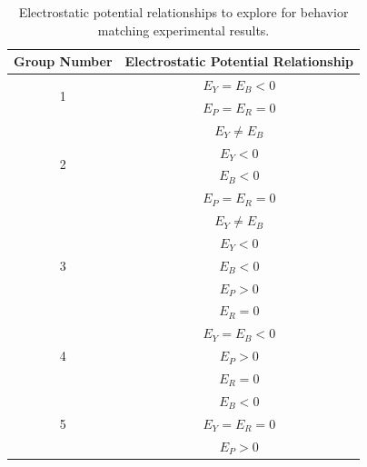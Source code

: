 \documentclass[../../AdvancementSummary.tex]{subfiles}
\begin{document}
\begin{table}[H]
\caption{Electrostatic potential relationships to explore for behavior matching experimental results. \label{table: ElecPotentialRelationships}}
\begin{center}
\begin{tabular}{| c | c |}
\hline
Group Number & Electrostatic Potential Relationship \\
\hline
\multicolumn{1}{|c|}{\multirow{2}[0]{*}{1}}  &  $E_Y = E_B < 0$\\
							&	   $E_P = E_R = 0 $\\
\hline
\multicolumn{1}{|c|}{\multirow{4}[0]{*}{2}}  &  $E_Y \neq E_B $\\
							&	   $E_Y < 0$ \\
							&	   $E_B < 0$ \\
							&	  $E_P = E_R = 0 $\\
\hline
\multicolumn{1}{|c|}{\multirow{5}[0]{*}{3}} 	& $E_Y \neq E_B$\\
							        & $E_Y < 0$ \\
								& $E_B < 0$ \\
								& $E_P > 0 $\\
								& $E_R = 0 $\\
\hline
\multicolumn{1}{|c|}{\multirow{3}[0]{*}{4}} 	& $E_Y = E_B <0 $\\
								& $E_P > 0 $\\
								& $E_R = 0 $\\
\hline
\multicolumn{1}{|c|}{\multirow{3}[0]{*}{5}} 	& $E_B <0 $\\
								& $E_Y = E_R=0 $\\
								& $E_P > 0 $\\
\hline
\end{tabular}
\end{center}
\end{table}					



\end{document}
